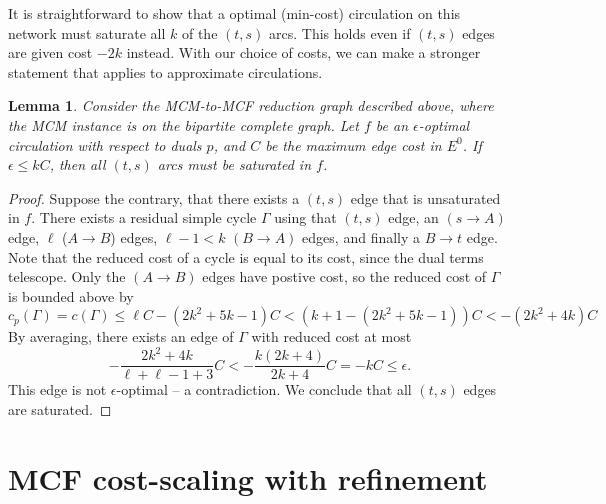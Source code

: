 \documentclass[11pt]{article}
\theoremstyle{plain}
\newtheorem{lemma}{Lemma}
\begin{document}
It is straightforward to show that a optimal (min-cost) circulation on this network
must saturate all $k$ of the $(t, s)$ arcs.
This holds even if $(t, s)$ edges are given cost $-2k$ instead.
With our choice of costs, we can make a stronger statement
that applies to approximate circulations.
\begin{lemma}
	Consider the MCM-to-MCF reduction graph described above,
	where the MCM instance is on the bipartite complete graph.
	Let $f$ be an $\epsilon$-optimal circulation with respect to duals $p$,
	and $C$ be the maximum edge cost in $E^0$.
	If $\epsilon \leq kC$, then all $(t, s)$ arcs must be saturated in $f$.
\end{lemma}
\begin{proof}
	Suppose the contrary, that there exists a $(t, s)$ edge that is unsaturated in $f$.
	There exists a residual simple cycle $\Gamma$ using that $(t, s)$ edge,
	an $(s \to A)$ edge, $\ell$ ($A \to B$) edges, $\ell-1 < k$ $(B \to A)$ edges,
	and finally a $B \to t$ edge.
	Note that the reduced cost of a cycle is equal to its cost, 
	since the dual terms telescope.
	Only the $(A \to B)$ edges have postive cost, 
	so the reduced cost of $\Gamma$ is bounded above by
	\begin{equation*}
		c_p(\Gamma) = c(\Gamma) 
			\leq \ell C - (2k^2 + 5k - 1)C < (k+1 - (2k^2 + 5k - 1))C 
			< - (2k^2 + 4k) C
	\end{equation*}
	By averaging, there exists an edge of $\Gamma$ with reduced cost at most
	\begin{equation*}
		-\frac{2k^2 + 4k}{\ell + \ell-1 + 3} C
			< -\frac{k(2k + 4)}{2k + 4} C
			= -kC
			\leq \epsilon.
	\end{equation*}
	This edge is not $\epsilon$-optimal -- a contradiction.
	We conclude that all $(t, s)$ edges are saturated.
\end{proof}


\section{MCF cost-scaling with refinement}
\end{document}
